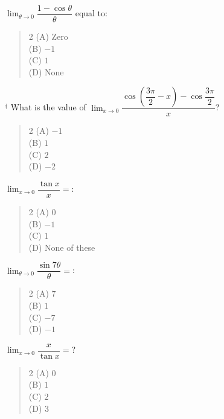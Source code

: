 \documentclass[11pt,a4paper]{article}
\begin{document}
\begin{mcqlist}
\item $\displaystyle\lim_{\theta\to0}\dfrac{1-\cos\theta}{\theta}$ equal to:
\begin{quote}\begin{multicols}{2}
\noindent (A) Zero \\
(B) $-1$ \\
(C) $1$ \\
(D) None
\end{multicols}\end{quote}

\item $^{\dagger}$ What is the value of $\displaystyle\lim_{x\to0}\dfrac{\cos\left(\dfrac{3\pi}{2}-x\right)-\cos\dfrac{3\pi}{2}}{x}$?
\begin{quote}\begin{multicols}{2}
\noindent (A) $-1$ \\
(B) $1$ \\
(C) $2$ \\
(D) $-2$
\end{multicols}\end{quote}

\item $\displaystyle\lim_{x\to0}\dfrac{\tan x}{x} = $:
\begin{quote}\begin{multicols}{2}
\noindent (A) $0$ \\
(B) $-1$ \\
(C) $1$ \\
(D) None of these
\end{multicols}\end{quote}

\item $\displaystyle\lim_{\theta\to0}\dfrac{\sin7\theta}{\theta} = $:
\begin{quote}\begin{multicols}{2}
\noindent (A) $7$ \\
(B) $1$ \\
(C) $-7$ \\
(D) $-1$
\end{multicols}\end{quote}

\item $\displaystyle\lim_{x\to0}\dfrac{x}{\tan x} = $?
\begin{quote}\begin{multicols}{2}
\noindent (A) $0$ \\
(B) $1$ \\
(C) $2$ \\
(D) $3$
\end{multicols}\end{quote}


\end{mcqlist}
\end{document}

